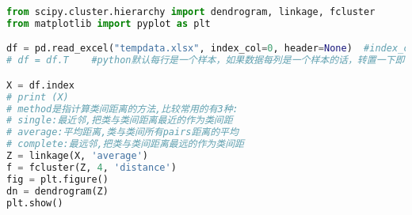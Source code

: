 \documentclass[withoutpreface,bwprint]{cumcmthesis} %
\begin{document}
\begin{appendices}
\begin{lstlisting}[language=python]
from scipy.cluster.hierarchy import dendrogram, linkage, fcluster
from matplotlib import pyplot as plt

df = pd.read_excel("tempdata.xlsx", index_col=0, header=None)  #index_col=0指定数据中第一列是类别名称，PS：计算机程序一般从整数0开始计数，所以0就代表第一列
# df = df.T    #python默认每行是一个样本，如果数据每列是一个样本的话，转置一下即可

X = df.index
# print (X)
# method是指计算类间距离的方法,比较常用的有3种:
# single:最近邻,把类与类间距离最近的作为类间距
# average:平均距离,类与类间所有pairs距离的平均
# complete:最远邻,把类与类间距离最远的作为类间距
Z = linkage(X, 'average')
f = fcluster(Z, 4, 'distance')
fig = plt.figure()
dn = dendrogram(Z)
plt.show()

 \end{lstlisting}
\end{appendices}
\end{document}
